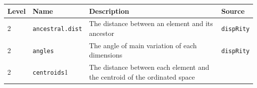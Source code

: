 \documentclass[
]{book}
\begin{document}
\begin{longtable}[]{@{}llll@{}}
\toprule
\begin{minipage}[b]{0.07\columnwidth}\raggedright
Level\strut
\end{minipage} & \begin{minipage}[b]{0.07\columnwidth}\raggedright
Name\strut
\end{minipage} & \begin{minipage}[b]{0.64\columnwidth}\raggedright
Description\strut
\end{minipage} & \begin{minipage}[b]{0.10\columnwidth}\raggedright
Source\strut
\end{minipage}\tabularnewline
\midrule
\endhead
\begin{minipage}[t]{0.07\columnwidth}\raggedright
2\strut
\end{minipage} & \begin{minipage}[t]{0.07\columnwidth}\raggedright
\texttt{ancestral.dist}\strut
\end{minipage} & \begin{minipage}[t]{0.64\columnwidth}\raggedright
The distance between an element and its ancestor\strut
\end{minipage} & \begin{minipage}[t]{0.10\columnwidth}\raggedright
\texttt{dispRity}\strut
\end{minipage}\tabularnewline
\begin{minipage}[t]{0.07\columnwidth}\raggedright
2\strut
\end{minipage} & \begin{minipage}[t]{0.07\columnwidth}\raggedright
\texttt{angles}\strut
\end{minipage} & \begin{minipage}[t]{0.64\columnwidth}\raggedright
The angle of main variation of each dimensions\strut
\end{minipage} & \begin{minipage}[t]{0.10\columnwidth}\raggedright
\texttt{dispRity}\strut
\end{minipage}\tabularnewline
\begin{minipage}[t]{0.07\columnwidth}\raggedright
2\strut
\end{minipage} & \begin{minipage}[t]{0.07\columnwidth}\raggedright
\texttt{centroids}1\strut
\end{minipage} & \begin{minipage}[t]{0.64\columnwidth}\raggedright
The distance between each element and the centroid of the ordinated space\strut

\end{minipage}
\end{longtable}
\end{document}
